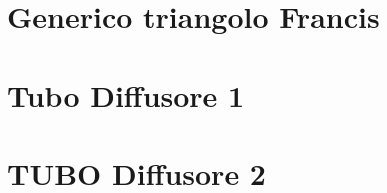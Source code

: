 \documentclass[a4paper, 15pt]{article}
\begin{document}
\section{Generico triangolo Francis}

\section{Tubo Diffusore 1}
\section{TUBO Diffusore 2}
\end{document}
